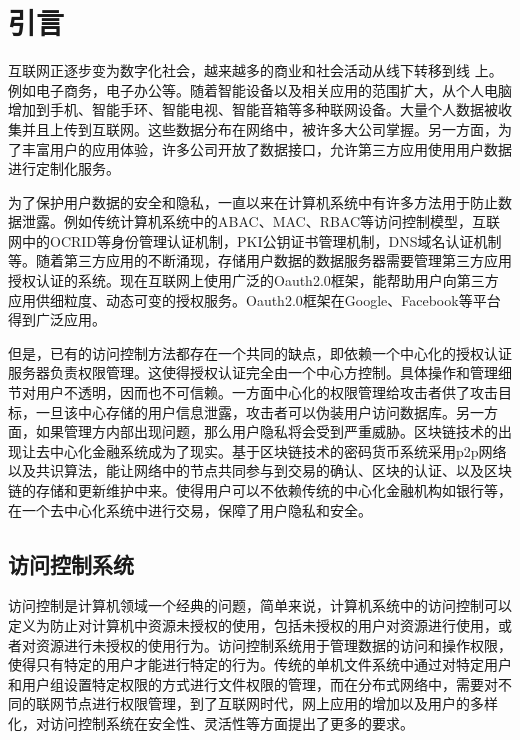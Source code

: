 
\chapter{引言}
\label{cha:intro}

互联网正逐步变为数字化社会，越来越多的商业和社会活动从线下转移到线 上。例如电子商务，电子办公等。随着智能设备以及相关应用的范围扩大，从个人电脑增加到手机、智能手环、智能电视、智能音箱等多种联网设备。大量个人数据被收 集并且上传到互联网。这些数据分布在网络中，被许多大公司掌握。另一方面，为 了丰富用户的应用体验，许多公司开放了数据接口，允许第三方应用使用用户数据进行定制化服务。 

为了保护用户数据的安全和隐私，一直以来在计算机系统中有许多方法用于防止数据泄露。例如传统计算机系统中的ABAC、MAC、RBAC等访问控制模型，互联网中的OCRID等身份管理认证机制，PKI公钥证书管理机制，DNS域名认证机制等。随着第三方应用的不断涌现，存储用户数据的数据服务器需要管理第三方应用授权认证的系统。现在互联网上使用广泛的Oauth2.0框架，能帮助用户向第三方应用供细粒度、动态可变的授权服务。Oauth2.0框架在Google、Facebook等平台得到广泛应用。

但是，已有的访问控制方法都存在一个共同的缺点，即依赖一个中心化的授权认证服务器负责权限管理。这使得授权认证完全由一个中心方控制。具体操作和管理细节对用户不透明，因而也不可信赖。一方面中心化的权限管理给攻击者供了攻击目标，一旦该中心存储的用户信息泄露，攻击者可以伪装用户访问数据库。另一方面，如果管理方内部出现问题，那么用户隐私将会受到严重威胁。区块链技术的出现让去中心化金融系统成为了现实。基于区块链技术的密码货币系统采用p2p网络以及共识算法，能让网络中的节点共同参与到交易的确认、区块的认证、以及区块链的存储和更新维护中来。使得用户可以不依赖传统的中心化金融机构如银行等，在一个去中心化系统中进行交易，保障了用户隐私和安全。 

\section{访问控制系统}

访问控制是计算机领域一个经典的问题，简单来说，计算机系统中的访问控制可以定义为防止对计算机中资源未授权的使用，包括未授权的用户对资源进行使用，或者对资源进行未授权的使用行为。访问控制系统用于管理数据的访问和操作权限，使得只有特定的用户才能进行特定的行为。传统的单机文件系统中通过对特定用户和用户组设置特定权限的方式进行文件权限的管理，而在分布式网络中，需要对不同的联网节点进行权限管理，到了互联网时代，网上应用的增加以及用户的多样化，对访问控制系统在安全性、灵活性等方面提出了更多的要求。

